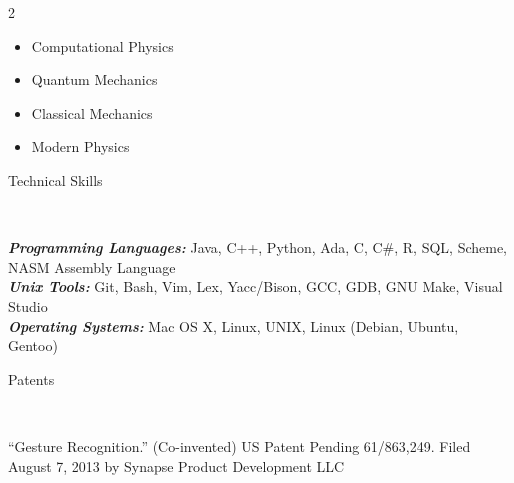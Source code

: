 \documentclass[9pt]{article}
\newenvironment{changemargin}[2]{%
  \begin{list}{}{%
    \setlength{\topsep}{0pt}%
    \setlength{\leftmargin}{#1}%
    \setlength{\rightmargin}{#2}%
    \setlength{\listparindent}{\parindent}%
    \setlength{\itemindent}{\parindent}%
    \setlength{\parsep}{\parskip}%
  }%
  \item[]}{\end{list}
}
\newcommand{\lineover}{
    \begin{changemargin}{-0.05in}{-0.05in}
        \vspace*{-8pt}
        \hrulefill \\
        \vspace*{-2pt}
    \end{changemargin}
}
\newcommand{\header}[1]{
    \begin{changemargin}{-0.5in}{-0.5in}
        {\large #1}\\
        \lineover
    \end{changemargin}
}
\newenvironment{body} {
    \vspace*{-16pt}
    \begin{changemargin}{-0.20in}{-0.5in}
  }
    {\end{changemargin}
}
\begin{document}
\begin{body}
\begin{multicols}{2}
\begin{itemize}
            \item [] Computational Physics
            \item [] Quantum Mechanics
            \item [] Classical Mechanics
            \item [] Modern Physics


        \end{itemize}
    \end{multicols}
\end{body}



\header{Technical Skills}
\begin{body}
    \vspace{14pt}
    \emph{\textbf{Programming Languages:}}{} Java, C++, Python, Ada, C, C\#, R, SQL, Scheme, NASM Assembly Language\\
    \medskip
    \emph{\textbf{Unix Tools:}}{} Git, Bash, Vim, Lex, Yacc/Bison, GCC, GDB, GNU Make, Visual Studio\\
    \medskip
    \emph{\textbf{Operating Systems:}}{} Mac OS X, Linux, UNIX, Linux (Debian, Ubuntu, Gentoo)\\
\end{body}

\smallskip



\header{Patents}
\begin{body}
    \vspace{14pt}
    ``Gesture Recognition.'' (Co-invented) US Patent Pending 61/863,249. Filed August 7, 2013 by Synapse Product Development LLC
\end{body}
\end{document}
